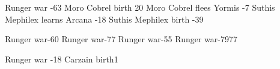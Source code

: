               {Runger war}               {-63}
        {Moro Cobrel birth}        {20}
   {Moro Cobrel flees Yormis} {-7}
          {Suthis Mephilex learns Arcana} {-18}
             {Suthis Mephilex birth}         {-39}

\newcommand{\Ambrose}          {Amras\xspace} %
\newcommand{\Onatol}           {Onatol\xspace}
\newcommand{\Anatoli}          {\Onatol}


\newcommand{\Sanyor} {Sanyor\xspace}

 {Runger war}{-60}
           {Runger war}{-77}
           {Runger war}{-55}
       {Runger war}{-79}{77} %

\begin{comment}
\subsubsection{The Military}
\end{comment}

\newcommand{\Delph}    {Delph\xspace}    %
\newcommand{\Tsekkect} {Tsekkect\xspace} %

 {Runger war}   {-18}
    {Carzain birth}{1}









\begin{comment}
\section{Redcor}
\end{comment}

\begin{comment}
\subsubsection{Vaimon Age}
\end{comment}

\begin{comment}
\subsubsection{Ortaican Age}
\end{comment}

